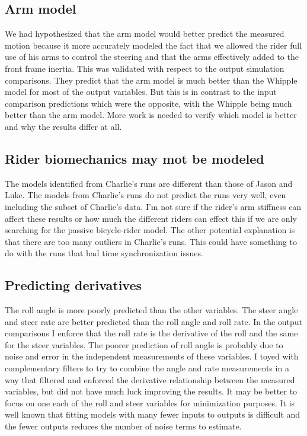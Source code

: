 \documentclass[a4paper]{article}
\begin{document}
\subsection{Arm model}

We had hypothesized that the arm model would better predict the measured
motion because it more accurately modeled the fact that we allowed the
rider full use of his arms to control the steering and that the arms
effectively added to the front frame inertia. This was validated with
respect to the output simulation comparisons. They predict that the arm
model is much better than the Whipple model for most of the output
variables. But this is in contrast to the input comparison predictions
which were the opposite, with the Whipple being much better than the arm
model. More work is needed to verify which model is better and why the
results differ at all.

\subsection{Rider biomechanics may mot be modeled}

The models identified from Charlie's runs are different than those of Jason and
Luke. The models from Charlie's runs do not predict the runs very well, even
including the subset of Charlie's data. I'm not sure if the rider's arm
stiffness can affect these results or how much the different riders can effect
this if we are only searching for the passive bicycle-rider model. The other
potential explanation is that there are too many outliers in Charlie's runs.
This could have something to do with the runs that had time synchronization
issues.

\subsection{Predicting derivatives}

The roll angle is more poorly predicted than the other variables. The
steer angle and steer rate are better predicted than the roll angle and
roll rate. In the output comparisons I enforce that the roll rate is the
derivative of the roll and the same for the steer variables. The poorer
prediction of roll angle is probably due to noise and error in the
independent measurements of these variables. I toyed with complementary
filters to try to combine the angle and rate measurements in a way that
filtered and enforced the derivative relationship between the measured
variables, but did not have much luck improving the results. It may be
better to focus on one each of the roll and steer variables for
minimization purposes. It is well known that fitting models with many
fewer inputs to outputs is difficult and the fewer outputs reduces the
number of noise terms to estimate.
\end{document}
